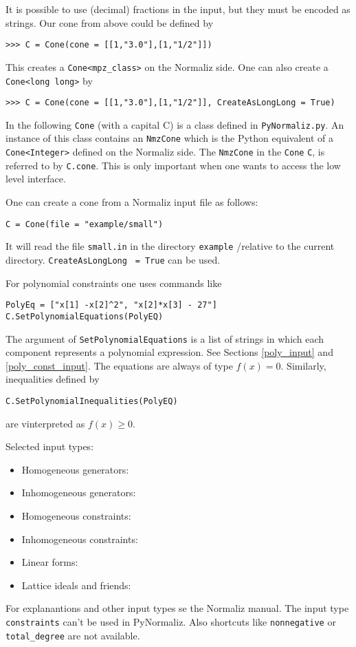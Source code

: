 \begin{small}
It is possible to use (decimal) fractions in the input, but they must be encoded as strings. Our cone from above could be defined by
\begin{Verbatim}
>>> C = Cone(cone = [[1,"3.0"],[1,"1/2"]])
\end{Verbatim}
This creates a \verb|Cone<mpz_class>| on the Normaliz side. One can also create a \verb|Cone<long long>| by
\begin{Verbatim}
>>> C = Cone(cone = [[1,"3.0"],[1,"1/2"]], CreateAsLongLong = True)
\end{Verbatim}

In the following \verb|Cone| (with a capital C) is a class defined in \verb|PyNormaliz.py|. An instance of this class contains an \verb|NmzCone| which is the Python equivalent of a \verb|Cone<Integer>| defined on the Normaliz side. The \verb|NmzCone| in the \verb|Cone| \verb|C|, is referred to by \verb|C.cone|. This is only important when one wants to access the low level interface.

One can create a cone from a Normaliz input file as follows:
\begin{Verbatim}
C = Cone(file = "example/small")
\end{Verbatim}
It will read the file \verb|small.in| in the directory \verb|example| /relative to the current directory.  \verb|CreateAsLongLong| \verb| = True| can be used.

For polynomial constraints one uses commands like
\begin{Verbatim}
PolyEq = ["x[1] -x[2]^2", "x[2]*x[3] - 27"]
C.SetPolynomialEquations(PolyEQ)
\end{Verbatim}
The argument of \verb|SetPolynomialEquations| is a list of strings in which each component represents a polynomial expression. See Sections \ref{poly_input} and \ref{poly_const_input}. The equations are always of type $f(x) = 0$. Similarly, inequalities defined by
\begin{Verbatim}
C.SetPolynomialInequalities(PolyEQ)
\end{Verbatim}
are vinterpreted as $f(x) \ge 0$.

Selected input types:
\begin{itemize}
\item Homogeneous generators:
\item Inhomogeneous generators:
\item Homogeneous constraints:
\item  Inhomogeneous constraints:
\item Linear forms:
\item Lattice ideals and friends:
\end{itemize}
For explanantions and other input types se the Normaliz manual. The input type \verb|constraints| can't be used in PyNormaliz. Also shortcuts like \verb|nonnegative| or \verb|total_degree| are not available.


\end{small}
